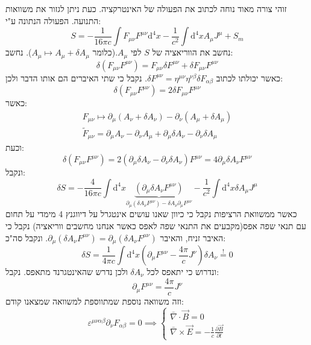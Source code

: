 \documentclass{tstextbook}
\begin{document}
זוהי צורה מאוד נוחה לכתוב את הפעולה של האינטרקציה. כעת ניתן לגזור את משוואות התנועה.
הפעולה הנתונה ע"י:
$$S=-\frac{1}{16\pi c} \int F_{\mu \nu} F^{\mu \nu} \mathrm{d}^4x-\frac{1}{c^2}\int\mathrm{d^4}x A_{\mu}J^\mu +S_{m}$$
נחשב את הווריאציה של \(S\) לפי \(A_{\mu}\).(כלומר \(A_{\mu}\mapsto A_{\mu}+\delta A_{\mu}\)). נחשב:
$$\delta\left( F_{\mu \nu}F^{\mu \nu} \right)=F_{\mu \nu}\delta F^{\mu \nu}+\delta F_{\mu \nu}F^{\mu \nu}$$
כאשר יכולתו לכתוב \(\delta F^{\mu \nu}=\eta^{\mu \nu}\eta^{\nu \beta}\delta F_{\alpha \beta}\). נקבל כי שתי האיברים הם אותו הדבר ולכן:
$$\delta\left( F_{\mu \nu}F^{\mu \nu} \right)=2\delta F_{\mu \nu}F^{\mu \nu}$$
כאשר:
\begin{gather*}F_{\mu \nu}\mapsto \partial_{\mu}\left( A_{\nu}+\delta A_{\nu} \right)-\partial_{\nu}\left( A_{\mu}+\delta A_{\mu} \right)  \\\tilde{F}_{\mu \nu}=\partial_{\mu} A_{\nu}-\partial_{\nu} A_{\mu}+\partial_{\mu}\delta A_{\nu}-\partial_{\nu}\delta A_{\mu}
\end{gather*}
וכעת:
$$\delta\left( F_{\mu \nu}F^{\mu \nu} \right)= 2 \left( \partial_{\mu}\delta A_{\nu}-\partial_{\nu}\delta A_{\nu} \right) F^{\mu \nu}=4\partial_{\mu}\delta A_{\nu}F^{\mu \nu}$$
ונקבל:
$$\delta S= -\frac{4}{16\pi c} \int \mathrm{d}^4x\underbrace{ \left( \partial_{\mu}\delta A_{\nu}F^{\mu \nu} \right) }_{ \partial_{\mu}\left( \delta A_{\nu }F^{\mu \nu} \right)-\delta A_{\nu}\partial_{\mu}F^{\mu \nu} }-\frac{1}{c^2}\int \mathrm{d}^4x \delta A_{\mu}J^\mu$$
כאשר ממשוואת הרציפות נקבל כי כיוון שאנו עושים אינטגרל על דיווגנץ 4 מימדי על תחום עם תנאי שפה אפס(מקבעים את התנאי שפה לאפס כאשר אנחנו מחשבים ווריאציה) נקבל כי האיבר זניח, והאיבר \(\partial_{\mu}\left( \delta A_{\nu }F^{\mu \nu} \right)=\partial_{\mu}\left( \delta A_{\nu}F^{\mu \nu} \right)\). ונקבל סה"כ:
$$\delta S = \frac{1}{4\pi c}\int \mathrm{d}^4 x \left( \partial_{\mu} F^{\mu \nu}-\frac{4\pi}{c} J^\nu \right)\delta A_{\nu}\overset{!}{=} 0$$
ונדרוש כי יתאפס לכל \(\delta A_{\nu}\) ולכן נדרש שהאינטגרנד מתאפס. נקבל:
$$\boxed{\partial_{\mu}F^{\mu \nu}=\frac{4\pi}{c}J^{\nu}}
$$
וזה משוואה נוספת שמתווספת למשוואה שמצאנו קודם:
$$\varepsilon^{\mu \nu \alpha \beta}\partial_{\nu}F_{\alpha \beta}=0\implies \begin{cases}\bar{\nabla} \cdot \vec{B} = 0 \\\bar{\nabla} \times \vec{E} = -\frac{1}{c} \frac{\partial \vec{B}}{\partial t} 
\end{cases}$$
\end{document}
